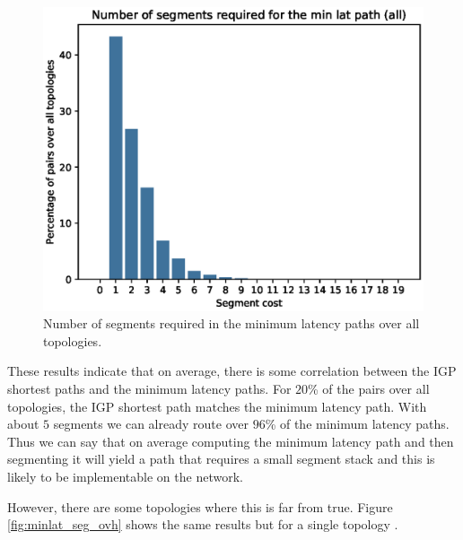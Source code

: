 \begin{figure}
\begin{center}
\includegraphics[scale=0.6]{./Network-lib/data/plot/minLat_seg.eps}
\end{center}
\caption{Number of segments required in the minimum latency paths over all topologies.}
\label{fig:minlat_seg}
\end{figure}

These results indicate that on average, there is some correlation between the IGP shortest paths and the
minimum latency paths. For $20$\% of the pairs over all topologies, the IGP shortest path matches the minimum latency
path. With about $5$ segments we can already route over $96$\% of the minimum latency paths. Thus we can say
that on average computing the minimum latency path and then segmenting it will yield a path that requires a small
segment stack and this is likely to be implementable on the network.

However, there are some topologies where this is far from true. Figure \ref{fig:minlat_seg_ovh} shows the same results
but for a single topology .

